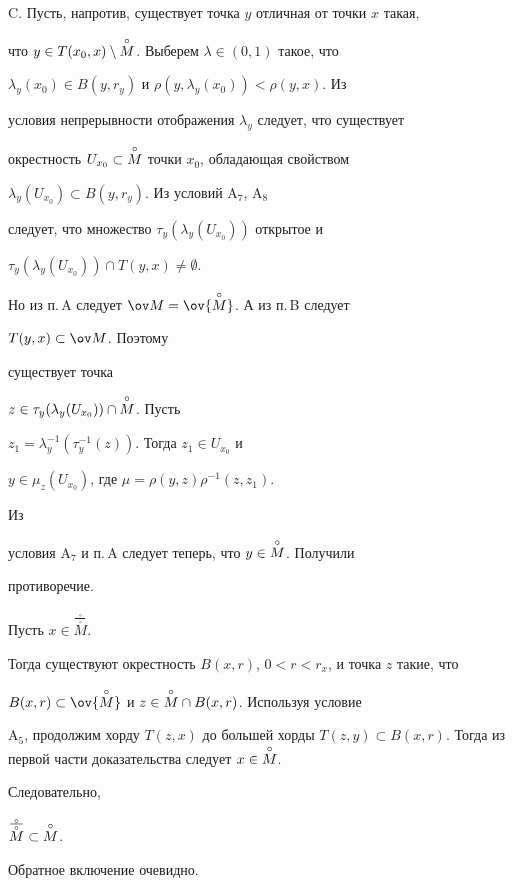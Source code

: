  


C. Пусть, напротив, существует точка $y$ отличная от точки $x$ такая, 


что $y\in T(x_0,x)\setminus\overset{\circ}{M}{}$. Выберем $\lambda\in(0,1)$ такое, что 


$\lambda_y(x_0)\in B(y,r_y)$ и $\rho(y,\lambda_y(x_0))<\rho(y,x)$. Из 


условия непрерывности отображения $\lambda_y$ следует, что существует 


окрестность $U_{x_0}\subset\overset{\circ}{M}{}$ точки $x_0$, обладающая свойством 


$\lambda_y(U_{x_0})\subset B(y,r_y)$. Из условий A${}_7$, A${}_8$ 


следует, что множество $\tau_y(\lambda_y(U_{x_0}))$ открытое и 


$\tau_y(\lambda_y(U_{x_0}))\cap T(y,x)\ne\emptyset$. 


Но из п.\,A следует $\ov M=\ov{\cM}$. А из п.\,B следует 


$T(y,x)\subset\ov M$. Поэтому 


существует точка 


$z\in\tau_y(\lambda_y(U_{x_0}))\cap\overset{\circ}{M}{}$. Пусть 


$z_1=\lambda^{-1}_y(\tau^{-1}_y(z))$. Тогда $z_1\in U_{x_0}$ и 


$y\in\mu_z(U_{x_0})$, где $\mu=\rho(y,z)\rho^{-1}(z,z_1)$. 


Из 


условия A${}_7$ и п.\,A следует теперь, что $y\in\overset{\circ}{M}{}$. Получили 


противоречие. 


 


Пусть $x\in\overset{\frac{\phantom{i}\circ\phantom{i}}{\circ}}{M}$. 


Тогда существуют окрестность $B(x,r)$, $0<r<r_x$, и точка $z$ такие, что 


$B(x,r)\subset\ov{\cM}$ и $z\in\overset{\circ}{M}{}\cap B(x,r)$. Используя условие 


A${}_5$, продолжим хорду $T(z,x)$ до большей хорды $T(z,y)\subset 


B(x,r)$. Тогда из первой части доказательства следует $x\in\cM$. 


Следовательно, 


$\overset{\frac{\phantom{i}\circ\phantom{i}}{\circ}}{M}\subset\overset{\circ}{M}{}$. 


Обратное включение очевидно. 


\medskip 


